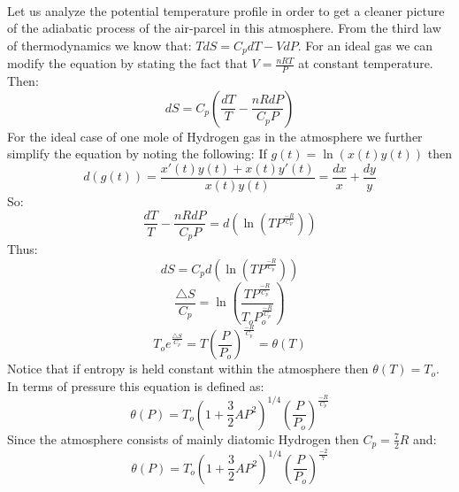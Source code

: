\documentclass[11pt]{article}
\begin{document}
    \begin{center}
    \end{center}
    { \hspace*{\fill} \\}
    
    Let us analyze the potential temperature profile in order to get a
cleaner picture of the adiabatic process of the air-parcel in this
atmosphere. From the third law of thermodynamics we know that:
\(TdS = C_p dT - VdP\). For an ideal gas we can modify the equation by
stating the fact that \(V = \frac{nRT}{P}\) at constant temperature.
Then: \[dS = C_p (\frac{dT}{T} - \frac{nRdP}{C_p P})\] For the ideal
case of one mole of Hydrogen gas in the atmosphere we further simplify
the equation by noting the following: If \(g(t) = \ln(x(t)y(t))\) then
\[d(g(t)) = \frac{x'(t) y(t) + x(t)y'(t)}{x(t)y(t)} = \frac{dx}{x} + \frac{dy}{y}\]
So: \[\frac{dT}{T} - \frac{nRdP}{C_p P} = d(\ln(T P^{\frac{-R}{C_p}}))\]
Thus: \[dS = C_pd(\ln(T P^{\frac{-R}{C_p}}))\]
\[\frac{\triangle S}{C_p} = \ln \left(\frac{T P^{\frac{-R}{C_p}}}{T_o P_o^{\frac{-R}{C_p}}}\right)\]
\[T_o e^{\frac{\triangle S}{C_p}} = T \left(\frac{P}{P_o}\right)^{\frac{-R}{C_p}} = \theta(T)\]
Notice that if entropy is held constant within the atmosphere then
\(\theta(T) = T_o\). In terms of pressure this equation is defined as:
\[\theta(P) =  T_o(1 + \frac{3}{2} AP^2)^{1/4} \left(\frac{P}{P_o}\right)^{\frac{-R}{C_p}}\]
Since the atmosphere consists of mainly diatomic Hydrogen then
\(C_p = \frac{7}{2}R\) and:
\[\theta(P) =  T_o(1 + \frac{3}{2} AP^2)^{1/4} \left(\frac{P}{P_o}\right)^{\frac{-2}{7}}\]
\end{document}
